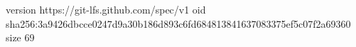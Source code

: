 version https://git-lfs.github.com/spec/v1
oid sha256:3a9426dbcce0247d9a30b186d893c6fd684813841637083375ef5c07f2a69360
size 69
